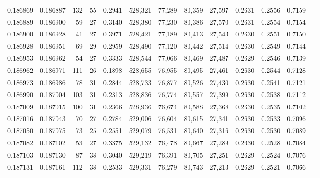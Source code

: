 \begin{tabular}{rrrrrrrrrrrrr}
0.186869 & 0.186887 &   132 &  55 &                                     0.2941 & 528,321 &  77,289 &  80,359 &  27,597 & 0.2631 & 0.2556 & 0.7159 \\
0.186889 & 0.186900 &    59 &  27 &                                     0.3140 & 528,380 &  77,230 &  80,386 &  27,570 & 0.2631 & 0.2554 & 0.7154 \\
0.186900 & 0.186928 &    41 &  27 &                                     0.3971 & 528,421 &  77,189 &  80,413 &  27,543 & 0.2630 & 0.2551 & 0.7150 \\
0.186928 & 0.186951 &    69 &  29 &                                     0.2959 & 528,490 &  77,120 &  80,442 &  27,514 & 0.2630 & 0.2549 & 0.7144 \\
0.186953 & 0.186962 &    54 &  27 &                                     0.3333 & 528,544 &  77,066 &  80,469 &  27,487 & 0.2629 & 0.2546 & 0.7139 \\
0.186962 & 0.186971 &   111 &  26 &                                     0.1898 & 528,655 &  76,955 &  80,495 &  27,461 & 0.2630 & 0.2544 & 0.7128 \\
0.186973 & 0.186986 &    78 &  31 &                                     0.2844 & 528,733 &  76,877 &  80,526 &  27,430 & 0.2630 & 0.2541 & 0.7121 \\
0.186990 & 0.187004 &   103 &  31 &                                     0.2313 & 528,836 &  76,774 &  80,557 &  27,399 & 0.2630 & 0.2538 & 0.7112 \\
0.187009 & 0.187015 &   100 &  31 &                                     0.2366 & 528,936 &  76,674 &  80,588 &  27,368 & 0.2630 & 0.2535 & 0.7102 \\
0.187016 & 0.187043 &    70 &  27 &                                     0.2784 & 529,006 &  76,604 &  80,615 &  27,341 & 0.2630 & 0.2533 & 0.7096 \\
0.187050 & 0.187075 &    73 &  25 &                                     0.2551 & 529,079 &  76,531 &  80,640 &  27,316 & 0.2630 & 0.2530 & 0.7089 \\
0.187082 & 0.187102 &    53 &  27 &                                     0.3375 & 529,132 &  76,478 &  80,667 &  27,289 & 0.2630 & 0.2528 & 0.7084 \\
0.187103 & 0.187130 &    87 &  38 &                                     0.3040 & 529,219 &  76,391 &  80,705 &  27,251 & 0.2629 & 0.2524 & 0.7076 \\
0.187131 & 0.187161 &   112 &  38 &                                     0.2533 & 529,331 &  76,279 &  80,743 &  27,213 & 0.2629 & 0.2521 & 0.7066 \\

\end{tabular}
